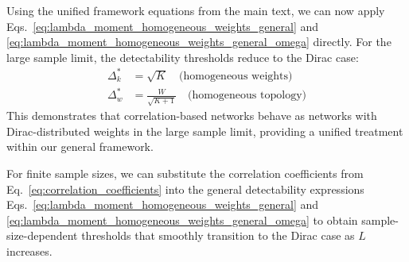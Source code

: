 \documentclass[a4paper,pre,superscriptaddress,floatfix,nofootinbib,twocolumn]{revtex4-1}
\begin{document}
Using the unified framework equations from the main text, we can now apply Eqs.~\eqref{eq:lambda_moment_homogeneous_weights_general} and \eqref{eq:lambda_moment_homogeneous_weights_general_omega} directly. For the large sample limit, the detectability thresholds reduce to the Dirac case:
\begin{align}
    \Delta_k^* &= \sqrt{K} \quad \text{(homogeneous weights)}\\
    \Delta_{w}^* &= \frac{W}{\sqrt{K+1}} \quad \text{(homogeneous topology)}
\end{align}
This demonstrates that correlation-based networks behave as networks with Dirac-distributed weights in the large sample limit, providing a unified treatment within our general framework.

For finite sample sizes, we can substitute the correlation coefficients from Eq.~\eqref{eq:correlation_coefficients} into the general detectability expressions Eqs.~\eqref{eq:lambda_moment_homogeneous_weights_general} and \eqref{eq:lambda_moment_homogeneous_weights_general_omega} to obtain sample-size-dependent thresholds that smoothly transition to the Dirac case as $L$ increases.

%
%
%
%
%
\end{document}
